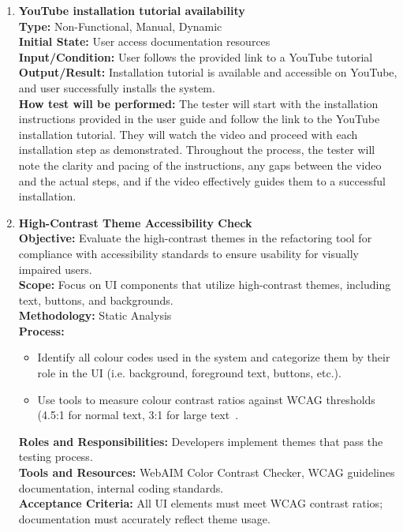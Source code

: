 \documentclass[12pt, titlepage]{article}
\begin{document}
\begin{enumerate}[label={\bf \textcolor{Maroon}{test-UH-\arabic*}}, wide=0pt, font=\itshape]
  \item \textbf{YouTube installation tutorial availability} \\[2mm]
    \textbf{Type:} Non-Functional, Manual, Dynamic \\ 
    \textbf{Initial State:} User access documentation resources \\
    \textbf{Input/Condition:} User follows the provided link to a YouTube tutorial \\
    \textbf{Output/Result:} Installation tutorial is available and accessible on YouTube, and user successfully installs the system. \\[2mm]
    \textbf{How test will be performed:} The tester will start with the installation instructions provided in the user guide and follow the link to the YouTube installation tutorial. They will watch the video and proceed with each installation step as demonstrated. Throughout the process, the tester will note the clarity and pacing of the instructions, any gaps between the video and the actual steps, and if the video effectively guides them to a successful installation. 

  \item \textbf{High-Contrast Theme Accessibility Check} \\[2mm]
    \textbf{Objective:} Evaluate the high-contrast themes in the refactoring tool for compliance with accessibility standards to ensure usability for visually impaired users. \\
    \textbf{Scope:} Focus on UI components that utilize high-contrast themes, including text, buttons, and backgrounds. \\
    \textbf{Methodology:} Static Analysis \\
    \textbf{Process:} 
    \begin{itemize}
      \item Identify all colour codes used in the system and categorize them by their role in the UI (i.e. background, foreground text, buttons, etc.).
      \item Use tools to measure colour contrast ratios against WCAG thresholds (4.5:1 for normal text, 3:1 for large text~\cite{WCAG}.
    \end{itemize}
    \textbf{Roles and Responsibilities:} Developers implement themes that pass the testing process. \\[2mm]
    \textbf{Tools and Resources:} WebAIM Color Contrast Checker, WCAG guidelines documentation, internal coding standards. \\[2mm]
    \textbf{Acceptance Criteria:} All UI elements must meet WCAG contrast ratios; documentation must accurately reflect theme usage.


\end{enumerate}
\end{document}

